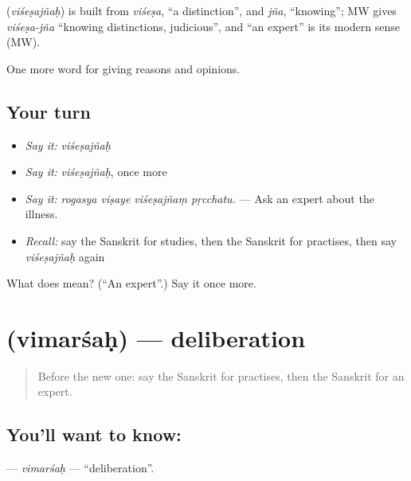 \begin{cousinweb}
\textbf{} (\emph{viśeṣajñaḥ}) is built from \emph{viśeṣa}, \textquotedblleft{}a distinction\textquotedblright{}, and \emph{jña}, \textquotedblleft{}knowing\textquotedblright{}; MW gives \emph{viśeṣa-jña} \textquotedblleft{}knowing distinctions, judicious\textquotedblright{}, and \textquotedblleft{}an expert\textquotedblright{} is its modern sense (MW).
\end{cousinweb}

\begin{grammarlens}[title={What you've built}]
One more word for giving reasons and opinions.
\end{grammarlens}

\subsection*{Your turn}
\begin{itemize}
\raggedright
  \item \emph{Say it:} \emph{viśeṣajñaḥ}
  \item \emph{Say it:} \emph{viśeṣajñaḥ}, once more
  \item \emph{Say it:} \emph{rogasya viṣaye viśeṣajñaṃ pṛcchatu.} — Ask an expert about the illness.
  \item \emph{Recall:} say the Sanskrit for studies, then the Sanskrit for practises, then say \emph{viśeṣajñaḥ} again
\end{itemize}

\begin{tcolorbox}[breakable,colback=teal!4,colframe=teal!35!black,title={Before you move on}]
What does  mean? (\textquotedblleft{}An expert\textquotedblright{}.) Say it once more.
\end{tcolorbox}
\section[\texorpdfstring{\sk{विमर्शः} (vimarśaḥ)}{विमर्शः (vimarśaḥ)}]{ (vimarśaḥ) — deliberation}

\label{lesson:SA-C364-vimarsah}



\begin{quote}
Before the new one: say the Sanskrit for practises, then the Sanskrit for an expert.
\end{quote}

\subsection*{You'll want to know: }
\textbf{} — \emph{vimarśaḥ} — \textquotedblleft{}deliberation\textquotedblright{}.

